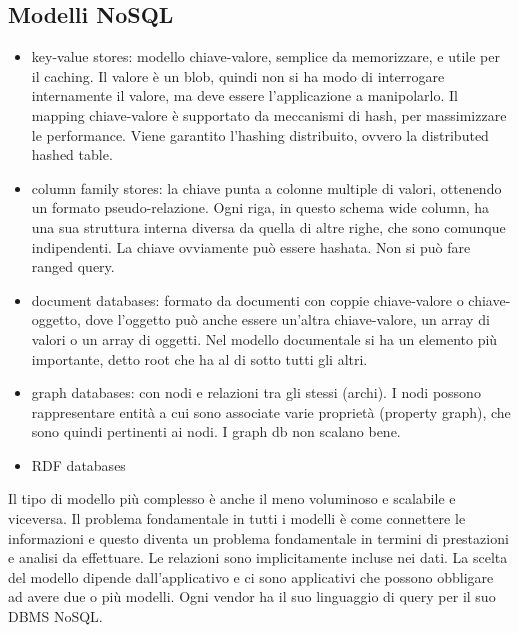 \subsection{Modelli NoSQL}
\begin{itemize}
    \item key-value stores: modello chiave-valore, semplice da memorizzare, e utile per il caching.  Il valore è un blob, quindi non si ha modo di interrogare internamente il valore, ma deve essere l’applicazione a manipolarlo. Il mapping chiave-valore è supportato da meccanismi di hash, per massimizzare le performance. Viene garantito l’hashing distribuito, ovvero la distributed hashed table.
    \item column family stores: la chiave punta a colonne multiple di valori, ottenendo un formato pseudo-relazione. Ogni riga, in questo schema wide column, ha una sua struttura interna diversa da quella di altre righe, che sono comunque indipendenti. La chiave ovviamente può essere hashata. Non si può fare ranged query.
    \item document databases: formato da documenti con coppie chiave-valore o chiave-oggetto, dove l’oggetto può anche essere un’altra chiave-valore, un array di valori o un array di oggetti. Nel modello documentale si ha un elemento più importante, detto root che ha al di sotto tutti gli altri.
    \item graph databases: con nodi e relazioni tra gli stessi (archi). I nodi possono rappresentare entità a cui sono associate varie proprietà (property graph), che sono quindi pertinenti ai nodi. I graph db non scalano bene.
    \item RDF databases
\end{itemize}

Il tipo di modello più complesso è anche il meno voluminoso e scalabile e viceversa. 
Il problema fondamentale in tutti i modelli è come connettere le informazioni e questo diventa un problema fondamentale in termini di prestazioni e analisi da effettuare. 
Le relazioni sono implicitamente incluse nei dati. 
La scelta del modello dipende dall’applicativo e ci sono applicativi che possono obbligare ad avere due o più modelli.
Ogni vendor ha il suo linguaggio di query per il suo DBMS NoSQL.

